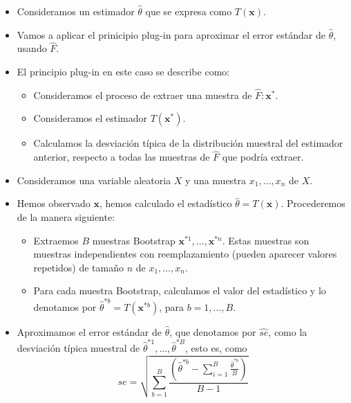 \begin{tcolorbox}[colback=blue!5!white, colframe=blue!75!black, title=\textbf{Idea del error estándar Bootstrap:}]
\begin{itemize}[label=\textbullet]
    \item Consideramos un estimador $\hat{\theta}$ que se expresa como $T(\mathbf{x})$.
    \item Vamos a aplicar el prinicipio plug-in para aproximar el error estándar de $\hat{\theta}$, usando $\hat{F}$.
    \item El principio plug-in en este caso se describe como:
        \begin{itemize}[label=\textrightarrow]
            \item Consideramos el proceso de extraer una muestra de $\hat{F}:\mathbf{x}^*$.
            \item Consideramos el estimador $T(\mathbf{x}^*)$.
            \item Calculamos la desviación típica de la distribución muestral del estimador anterior, respecto a todas las muestras de $\hat{F}$ que podría extraer.
        \end{itemize}
    \item Consideramos una variable aleatoria $X$ y una muestra $x_1,\dots,x_n$ de $X$.
    \item Hemos observado $\mathbf{x}$, hemos calculado el estadístico $\hat{\theta}=T(\mathbf{x})$. Procederemos de la manera siguiente:
        \begin{itemize}[label=\textrightarrow]
            \item Extraemos $B$ muestras Bootstrap $\mathbf{x}^{*1},\dots,\mathbf{x}^{*n}$. Estas muestras son muestras independientes con reemplazamiento (pueden aparecer valores repetidos) de tamaño $n$ de $x_1,\dots,x_n$.
            \item Para cada muestra Bootstrap, calculamos el valor del estadístico y lo denotamos por $\hat{\theta}^{*b}=T(\mathbf{x}^{*b})$, para $b=1,\dots,B$.
        \end{itemize}
    \item Aproximamos el error estándar de $\hat{\theta}$, que denotamos por $\hat{se}$, como la desviación típica muestral de $\hat{\theta}^{*1},\dots,\hat{\theta}^{*B}$, esto es, como \[
    \hat{se}=\sqrt{\sum_{b=1}^{B} \dfrac{\left(\hat{\theta}^{*b}-\sum_{i=1}^{B}\frac{\hat{\theta}^{*b}}{B} \right) }{B-1}} 
    \] 
\end{itemize}
\end{tcolorbox}
\newpage

